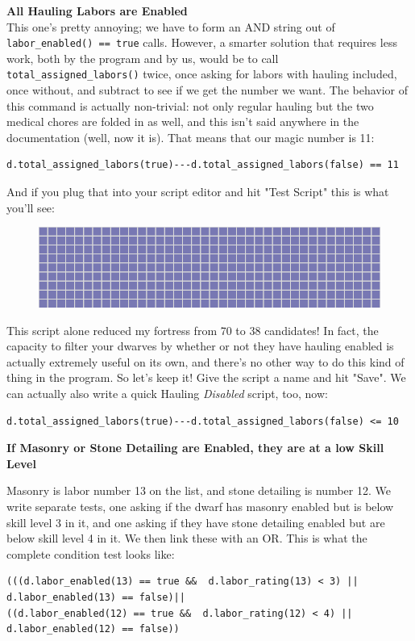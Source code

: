 \documentclass[]{article}
\begin{document}
\textbf{All Hauling Labors are Enabled}\\
This one's pretty annoying; we have to form an AND string out of \texttt{labor\_enabled() == true}
calls. However, a smarter solution that requires less work, both by the program and by us, would be to
call\\\texttt{total\_assigned\_labors()} twice, once asking for labors with hauling included, once
without, and subtract to see if we get the number we want. The behavior of this command is actually
non-trivial: not only regular hauling but the two medical chores are folded in as well, and this isn't
said anywhere in the documentation (well, now it is). That means that our magic number is 11:

\begin{verbatim}
d.total_assigned_labors(true)---d.total_assigned_labors(false) == 11
\end{verbatim}

And if you plug that into your script editor and hit "Test Script" this is what you'll see:

\begin{figure}[h!]
\centering
\includegraphics[scale=.91]{Sec4Fig3}
\end{figure}

This script alone reduced my fortress from 70 to 38 candidates! In fact, the capacity to filter your
dwarves by whether or not they have hauling enabled is actually extremely useful on its own, and there's
no other way to do this kind of thing in the program. So let's keep it! Give the script a name and hit
"Save". We can actually also write a quick Hauling \emph{Disabled} script, too, now:
\begin{verbatim}
d.total_assigned_labors(true)---d.total_assigned_labors(false) <= 10
\end{verbatim}

\textbf{If Masonry or Stone Detailing are Enabled, they are at a low Skill Level}

Masonry is labor number 13 on the list, and stone detailing is number 12. We write separate tests, one
asking if the dwarf has masonry enabled but is below skill level 3 in it, and one asking if they have
stone detailing enabled but are below skill level 4 in it. We then link these with an OR. This is what
the complete condition test looks like:
\begin{verbatim}
(((d.labor_enabled(13) == true &&  d.labor_rating(13) < 3) ||
d.labor_enabled(13) == false)|| 
((d.labor_enabled(12) == true &&  d.labor_rating(12) < 4) ||
d.labor_enabled(12) == false))
\end{verbatim}
\end{document}

